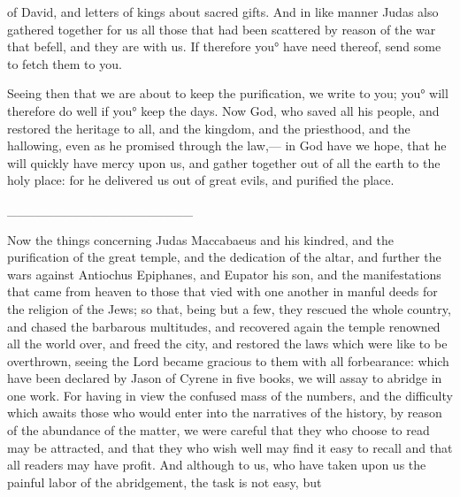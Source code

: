 {{} of David, and letters of kings about sacred gifts.
And in like manner Judas also gathered together for us all those
{} that had been scattered by reason of the war that befell, and they are
{} with us.
If therefore you° have need thereof, send some to fetch them to you.
\par }{\PP {}Seeing then that we are about to keep the purification, we write to you; you° will therefore do well if you° keep the days.
Now God, who saved all his people, and restored the heritage to all, and the kingdom, and the priesthood, and the hallowing,
even as he promised through the law,— in God have we hope, that he will quickly have mercy upon us, and gather
{} together out of
 all the earth to the holy place: for he delivered us out of great evils, and purified the place.
\par }{\BB \par }{\PC \_\_\_\_\_\_\_\_\_\_\_\_\_\_\_\_\_\_\_\_
\par }{\BB \par }{\PP {}Now the things concerning Judas Maccabaeus and his kindred, and the purification of the
 great temple, and the dedication of the altar,
and further the wars against Antiochus Epiphanes, and Eupator his son,
and the manifestations that came from heaven to those that vied with one another in manful deeds for the religion of the Jews; so that, being but a few, they
 rescued the whole country, and chased the barbarous multitudes,
and recovered again the temple renowned all the world over, and freed the city, and restored the laws which were like to be overthrown, seeing the Lord became
 gracious to them with all forbearance:
 which have been declared by Jason of Cyrene in five books, we will assay to abridge in one work.
For having in view the confused mass of the numbers, and the
 difficulty which awaits those who would enter into the narratives of the history, by reason of the abundance of the matter,
we were careful that they who choose to read may be attracted, and that they who wish well
{} may find it easy to recall
{} and that all readers may have profit.
And although to us, who have taken upon us the painful labor of the abridgement, the task is not easy, but
}
